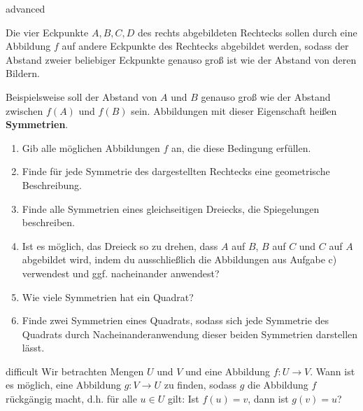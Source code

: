 \documentclass[../funktionen.tex]{subfiles}
\begin{document}
\begin{exercise}{advanced}
    
    Die vier Eckpunkte $A,B,C,D$ des rechts abgebildeten Rechtecks sollen durch eine Abbildung $f$ auf andere Eckpunkte des Rechtecks abgebildet werden, sodass der Abstand zweier beliebiger Eckpunkte genauso groß ist wie der Abstand von deren Bildern. 
    
    Beispielsweise soll der Abstand von $A$ und $B$ genauso groß wie der Abstand zwischen $f(A)$ und $f(B)$ sein. Abbildungen mit dieser Eigenschaft heißen \textbf{Symmetrien}.
    \begin{enumerate}
        \item Gib alle möglichen Abbildungen $f$ an, die diese Bedingung erfüllen.
        \item Finde für jede Symmetrie des dargestellten Rechtecks eine geometrische Beschreibung.
        \item Finde alle Symmetrien eines gleichseitigen Dreiecks, die Spiegelungen beschreiben.
        \item Ist es möglich, das Dreieck so zu drehen, dass $A$ auf $B$, $B$ auf $C$ und $C$ auf $A$ abgebildet wird, indem du ausschließlich die Abbildungen aus Aufgabe c) verwendest und ggf. nacheinander anwendest?
        \item Wie viele Symmetrien hat ein Quadrat?
        \item Finde zwei Symmetrien eines Quadrats, sodass sich jede Symmetrie des Quadrats durch Nacheinanderanwendung dieser beiden Symmetrien darstellen lässt.
    \end{enumerate}
\end{exercise}

\begin{exercise}{difficult}
    Wir betrachten Mengen $U$ und $V$ und eine Abbildung $f\colon U\rightarrow V$. Wann ist es möglich, eine Abbildung $g\colon V\rightarrow U$ zu finden, sodass $g$ die Abbildung $f$ rückgängig macht, d.h. für alle $u\in U$ gilt: Ist $f(u)=v$, dann ist $g(v)=u$?
\end{exercise}
\end{document}

